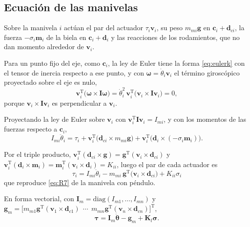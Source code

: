 \documentclass[11pt]{article}
\newcommand{\T}{^{\mathrm{T}}}
\newcommand{\wv}{\boldsymbol{\omega}}
\newcommand{\sig}{\boldsymbol{\sigma}}
\newcommand{\thv}{\boldsymbol{\theta}}
\newcommand{\tauv}{\boldsymbol{\tau}}
\begin{document}
\subsection{Ecuación de las manivelas}

Sobre la manivela $i$ actúan el par del actuador $\tau_i\mathbf{v}_i$, su peso $m_{mi}\mathbf{g}$ en $\mathbf{c}_i+\mathbf{d}_{ci}$, la fuerza $-\sigma_i\mathbf{m}_i$ de la biela en $\mathbf{c}_i+\mathbf{d}_i$ y las reacciones de los rodamientos, que no dan momento alrededor de $\mathbf{v}_i$.

Para un punto fijo del eje, como $\mathbf{c}_i$, la ley de Euler tiene la forma \eqref{eq:eulerk} con el tensor de inercia respecto a ese punto, y con $\wv=\dot\theta_i\mathbf{v}_i$ el término giroscópico proyectado sobre el eje es nulo,
\begin{equation}
\mathbf{v}_i\T\big(\wv\times\mathbf{I}\wv\big)=\dot\theta_i^2\,\mathbf{v}_i\T\big(\mathbf{v}_i\times\mathbf{I}\mathbf{v}_i\big)=0 ,
\label{eq:girmani}
\end{equation}
porque $\mathbf{v}_i\times\mathbf{I}\mathbf{v}_i$ es perpendicular a $\mathbf{v}_i$.

Proyectando la ley de Euler sobre $\mathbf{v}_i$ con $\mathbf{v}_i\T\mathbf{I}\mathbf{v}_i=I_{mi}$, y con los momentos de las fuerzas respecto a $\mathbf{c}_i$,
\begin{equation}
I_{mi}\ddot\theta_i=\tau_i+\mathbf{v}_i\T\big(\mathbf{d}_{ci}\times m_{mi}\mathbf{g}\big)+\mathbf{v}_i\T\big(\mathbf{d}_i\times(-\sigma_i\mathbf{m}_i)\big).
\label{eq:manivela}
\end{equation}

Por el triple producto, $\mathbf{v}_i\T(\mathbf{d}_{ci}\times\mathbf{g})=\mathbf{g}\T(\mathbf{v}_i\times\mathbf{d}_{ci})$ y $\mathbf{v}_i\T(\mathbf{d}_i\times\mathbf{m}_i)=\mathbf{m}_i\T(\mathbf{v}_i\times\mathbf{d}_i)=K_{ii}$, luego el par de cada actuador es
\begin{equation}
\boxed{\ \tau_i=I_{mi}\ddot\theta_i-m_{mi}\,\mathbf{g}\T\big(\mathbf{v}_i\times\mathbf{d}_{ci}\big)+K_{ii}\sigma_i\ }
\label{eq:fi}
\end{equation}
que reproduce \eqref{eq:R7} de la manivela con péndulo.

En forma vectorial, con $\mathbf{I}_m=\mathrm{diag}(I_{m1},\dots,I_{mn})$ y $\mathbf{g}_m=\big[m_{m1}\mathbf{g}\T(\mathbf{v}_1\times\mathbf{d}_{c1})\ \ \cdots\ \ m_{mn}\mathbf{g}\T(\mathbf{v}_n\times\mathbf{d}_{cn})\big]\T$,
\begin{equation}
\tauv=\mathbf{I}_m\ddot{\thv}-\mathbf{g}_m+\mathbf{K}_l\sig .
\label{eq:fvec}
\end{equation}
\end{document}
